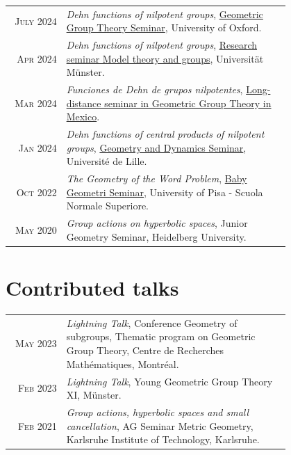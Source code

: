 \documentclass[a4paper,10pt]{article} %
\begin{document}
\begin{longtable}{rp{0.8\linewidth}}
    \textsc{July 2024} & \emph{Dehn functions of nilpotent groups}, \href{https://www.maths.ox.ac.uk/node/68709}{Geometric Group Theory Seminar}, University of Oxford. \\

    \textsc{Apr 2024} & \emph{Dehn functions of nilpotent groups}, \href{https://www.uni-muenster.de/Logik/en/Forschung/Research_Seminar_Model_theory_groups.html}{Research seminar Model theory and groups}, Universität Münster. \\

    \textsc{Mar 2024} & \emph{Funciones de Dehn de grupos nilpotentes}, \href{https://sites.google.com/view/seminar-ggt-mexico/}{Long-distance seminar in Geometric Group Theory in Mexico}.\\

    \textsc{Jan 2024} & \emph{Dehn functions of central products of nilpotent groups}, \href{https://math.univ-lille.fr/agenda/seminaires/seminaire-geometrie-dynamique}{Geometry and Dynamics Seminar}, Université de Lille. \\

    \textsc{Oct 2022} & \emph{The Geometry of the Word Problem}, \href{https://sites.google.com/view/babygeometri/edizioni-passate/20222023?authuser=0}{Baby Geometri Seminar}, University of Pisa - Scuola Normale Superiore.\\

    \textsc{May 2020} & \emph{Group actions on hyperbolic spaces}, \textcolor{linkcolour}{Junior Geometry Seminar}, Heidelberg University.\\
\end{longtable}

\section{Contributed talks}

\begin{longtable}{rp{0.8\linewidth}}

    \textsc{May 2023} & \emph{Lightning Talk}, Conference Geometry of subgroups, Thematic program on Geometric Group Theory, Centre de Recherches Mathématiques, Montréal. \\

    \textsc{Feb 2023} & \emph{Lightning Talk}, Young Geometric Group Theory XI, Münster.\\



    \textsc{Feb 2021} & \emph{Group actions, hyperbolic spaces and small cancellation}, AG Seminar Metric Geometry, Karlsruhe Institute of Technology, Karlsruhe.\\
\end{longtable}
\end{document}

